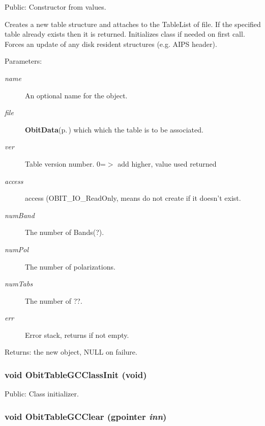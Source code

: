 Public: Constructor from values. 

Creates a new table structure and attaches to the Table\-List of file. If the specified table already exists then it is returned. Initializes class if needed on first call. Forces an update of any disk resident structures (e.g. AIPS header). \begin{Desc}
\item[Parameters:]
\begin{description}
\item[{\em name}]An optional name for the object. \item[{\em file}]{\bf Obit\-Data}{\rm (p.\,\pageref{structObitData})} which which the table is to be associated. \item[{\em ver}]Table version number. 0=$>$ add higher, value used returned \item[{\em access}]access (OBIT\_\-IO\_\-Read\-Only, means do not create if it doesn't exist. \item[{\em num\-Band}]The number of Bands(?). \item[{\em num\-Pol}]The number of polarizations. \item[{\em num\-Tabs}]The number of ??. \item[{\em err}]Error stack, returns if not empty. \end{description}
\end{Desc}
\begin{Desc}
\item[Returns:]the new object, NULL on failure. \end{Desc}
\subsubsection{\setlength{\rightskip}{0pt plus 5cm}void Obit\-Table\-GCClass\-Init (void)}\label{ObitTableGC_8c_a27}


Public: Class initializer. 

\subsubsection{\setlength{\rightskip}{0pt plus 5cm}void Obit\-Table\-GCClear (gpointer {\em inn})}\label{ObitTableGC_8c_a9}


